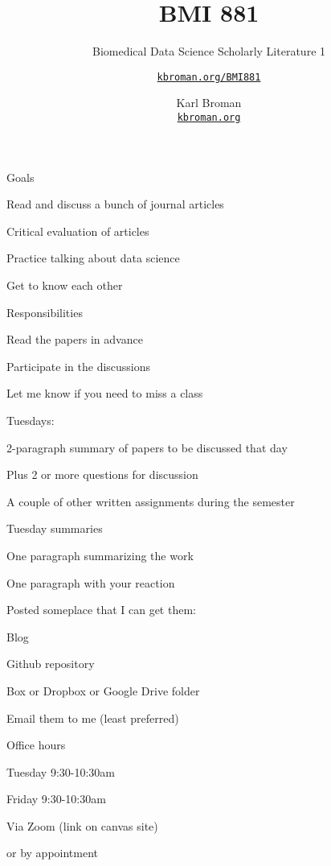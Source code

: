 \documentclass[aspectratio=169,12pt,t]{beamer}
\title{BMI 881}
\subtitle{Biomedical Data Science Scholarly Literature 1}
\author{\href{https://kbroman.org/BMI881}{\tt kbroman.org/BMI881} }
\institute{}
\date{\small \hspace{3in} Karl Broman \\
  \hspace{3in} \href{https://kbroman.org}{\color{foreground}
    \small \tt kbroman.org}}
\begin{document}
{
\frame{
  \titlepage
} }




\begin{frame}{Goals}

  \bbi
\item Read and discuss a bunch of journal articles
\item Critical evaluation of articles
\item Practice talking about data science
\item Get to know each other
  \ei

\end{frame}




\begin{frame}{Responsibilities}

  \bbi
\item Read the papers in advance
\item Participate in the discussions
\item Let me know if you need to miss a class
\item Tuesdays:
  \bi
  \item 2-paragraph summary of papers to be discussed that day
  \item Plus 2 or more questions for discussion
  \ei
\item A couple of other written assignments during the semester
  \ei

\end{frame}



\begin{frame}{Tuesday summaries}

  \bbi
\item One paragraph summarizing the work
\item One paragraph with your reaction
\item Posted someplace that I can get them:
  \bi
\item Blog
\item Github repository
\item Box or Dropbox or Google Drive folder
\item Email them to me (least preferred)
  \ei
\ei

\end{frame}


\begin{frame}{Office hours}

  \bbi
\item Tuesday 9:30-10:30am
\item Friday 9:30-10:30am
\item Via Zoom (link on canvas site)
\item \hilit or by appointment
\ei

\end{frame}
\end{document}
